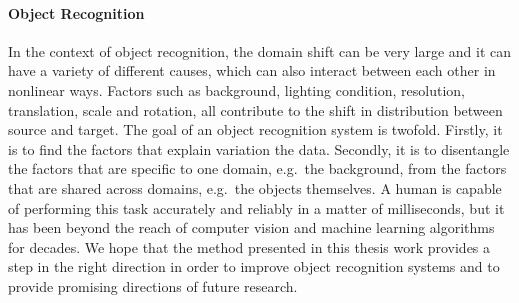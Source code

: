 \documentclass[../main.tex]{subfiles}
\begin{document}
    \paragraph{Object Recognition}
    In the context of object recognition, the domain shift can be very large and it can have a variety
    of different causes, which can also interact between each other in nonlinear ways. Factors such as background, lighting
    condition, resolution, translation, scale and rotation, all contribute to the shift in distribution between source and target.
    The goal of an object recognition system is twofold. Firstly, it is to find the factors that explain variation the data.
    Secondly, it is to disentangle the factors that are specific to one domain, e.g.\ the background, from the factors that are shared across
    domains, e.g.\ the objects themselves.
    A human is capable of performing this task accurately and reliably in a matter of milliseconds, but it has been beyond the
    reach of computer vision and machine learning algorithms for decades. We hope that the method presented in this thesis work
    provides a step in the right direction in order to improve object recognition systems and to provide promising directions
    of future research.
    
\end{document}
